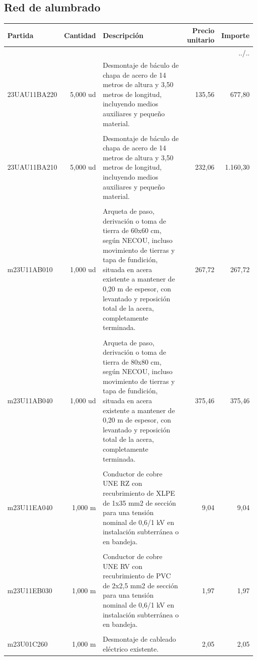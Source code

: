 \documentclass{book}%
\begin{document}
\subsection{Red de alumbrado}%
\small%
\begin{longtable}{lrlrr}%
Partida&Cantidad&Descripción&\multicolumn{1}{p{1.5cm}}{Precio unitario}&Importe\\%
\hline%
\endhead%
\multicolumn{5}{r}{../..}\\%
\endfoot%
\hline%
\endlastfoot%
23UAU11BA220&     5,000 ud&\multicolumn{1}{p{5cm}}{Desmontaje de báculo de chapa de acero de 14 metros de altura y 3,50 metros de longitud, incluyendo medios auxiliares y pequeño material.}&    135,56&677,80\\%
&&&&\\%
23UAU11BA210&     5,000 ud&\multicolumn{1}{p{5cm}}{Desmontaje de báculo de chapa de acero de 14 metros de altura y 3,50 metros de longitud, incluyendo medios auxiliares y pequeño material.}&    232,06&1.160,30\\%
&&&&\\%
m23U11AB010&     1,000 ud&\multicolumn{1}{p{5cm}}{Arqueta de paso, derivación o toma de tierra de 60x60 cm, según NECOU, incluso movimiento de tierras y tapa de fundición, situada en acera existente a mantener de 0,20 m de espesor, con levantado y reposición total de la acera, completamente terminada.}&    267,72&267,72\\%
&&&&\\%
m23U11AB040&     1,000 ud&\multicolumn{1}{p{5cm}}{Arqueta de paso, derivación o toma de tierra de 80x80 cm, según NECOU, incluso movimiento de tierras y tapa de fundición, situada en acera existente a mantener de 0,20 m de espesor, con levantado y reposición total de la acera, completamente terminada.}&    375,46&375,46\\%
&&&&\\%
m23U11EA040&     1,000 m&\multicolumn{1}{p{5cm}}{Conductor de cobre UNE RZ con recubrimiento de XLPE de 1x35 mm2 de sección para una tensión nominal de 0,6/1 kV en instalación subterránea o en bandeja.}&      9,04&9,04\\%
&&&&\\%
m23U11EB030&     1,000 m&\multicolumn{1}{p{5cm}}{Conductor de cobre UNE RV con recubrimiento de PVC de 2x2,5 mm2 de sección para una tensión nominal de 0,6/1 kV en instalación subterránea o en bandeja.}&      1,97&1,97\\%
&&&&\\%
m23U01C260&     1,000 m&\multicolumn{1}{p{5cm}}{Desmontaje de cableado eléctrico existente.}&      2,05&2,05\\%

\end{longtable}
\end{document}

